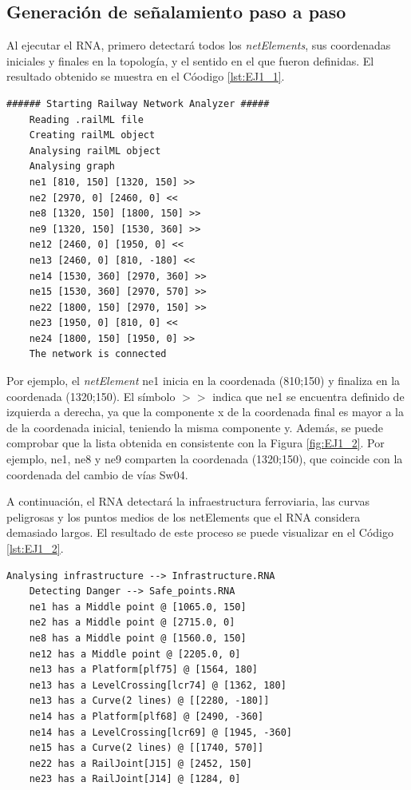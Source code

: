 \subsection{Generación de señalamiento paso a paso}

	
	
	Al ejecutar el RNA, primero detectará todos los \textit{netElements}, sus coordenadas iniciales y finales en la topología, y el sentido en el que fueron definidas. El resultado obtenido se muestra en el Cóodigo \ref{lst:EJ1_1}.
	
	\begin{lstlisting}[language = {}, caption = Detección de \textit{netElements} por parte del RNA , label = {lst:EJ1_1}]
	###### Starting Railway Network Analyzer #####
	Reading .railML file
	Creating railML object
	Analysing railML object
	Analysing graph
	ne1 [810, 150] [1320, 150] >>
	ne2 [2970, 0] [2460, 0] <<
	ne8 [1320, 150] [1800, 150] >>
	ne9 [1320, 150] [1530, 360] >>
	ne12 [2460, 0] [1950, 0] <<
	ne13 [2460, 0] [810, -180] <<
	ne14 [1530, 360] [2970, 360] >>
	ne15 [1530, 360] [2970, 570] >>
	ne22 [1800, 150] [2970, 150] >>
	ne23 [1950, 0] [810, 0] <<
	ne24 [1800, 150] [1950, 0] >>
	The network is connected
	\end{lstlisting}
	
	Por ejemplo, el \textit{netElement} ne1 inicia en la coordenada (810;150) y finaliza en la coordenada (1320;150). El símbolo $>>$ indica que ne1 se encuentra definido de izquierda a derecha, ya que la componente x de la coordenada final es mayor a la de la coordenada inicial, teniendo la misma componente y. Además, se puede comprobar que la lista obtenida en consistente con la Figura \ref{fig:EJ1_2}. Por ejemplo, ne1, ne8 y ne9 comparten la coordenada (1320;150), que coincide con la coordenada del cambio de vías Sw04.
	
	A continuación, el RNA detectará la infraestructura ferroviaria, las curvas peligrosas y los puntos medios de los netElements que el RNA considera demasiado largos. El resultado de este proceso se puede visualizar en el Código \ref{lst:EJ1_2}.
	
	\begin{lstlisting}[language = {}, caption = Detección de puntos críticos por parte del RNA , label = {lst:EJ1_2}]
	Analysing infrastructure --> Infrastructure.RNA
	Detecting Danger --> Safe_points.RNA
	ne1 has a Middle point @ [1065.0, 150]
	ne2 has a Middle point @ [2715.0, 0]
	ne8 has a Middle point @ [1560.0, 150]
	ne12 has a Middle point @ [2205.0, 0]
	ne13 has a Platform[plf75] @ [1564, 180]
	ne13 has a LevelCrossing[lcr74] @ [1362, 180]
	ne13 has a Curve(2 lines) @ [[2280, -180]]
	ne14 has a Platform[plf68] @ [2490, -360]
	ne14 has a LevelCrossing[lcr69] @ [1945, -360]
	ne15 has a Curve(2 lines) @ [[1740, 570]]
	ne22 has a RailJoint[J15] @ [2452, 150]
	ne23 has a RailJoint[J14] @ [1284, 0]
	\end{lstlisting}
	

